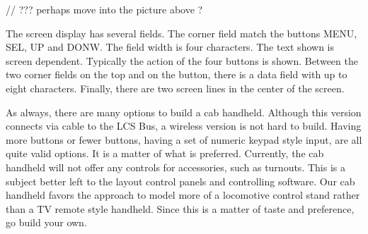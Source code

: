 // ??? perhaps move into the picture above ?


\begin{center}
\end{center}

The screen display has several fields. The corner field match the buttons MENU, SEL, UP and DONW. The field width is four characters. The text shown is screen dependent. Typically the action of the four buttons is shown. Between the two corner fields on the top and on the button, there is a data field with up to eight characters. Finally, there are two screen lines in the center of the screen. 

As always, there are many options to build a cab handheld. Although this version connects via cable to the LCS Bus, a wireless version is not hard to build. Having more buttons or fewer buttons, having a set of numeric keypad style input, are all quite valid options. It is a matter of what is preferred. Currently, the cab handheld will not offer any controls for accessories, such as turnouts. This is a subject better left to the layout control panels and controlling software. Our cab handheld favors the approach to model more of a locomotive control stand rather than a TV remote style handheld. Since this is a matter of taste and preference, go build your own.

